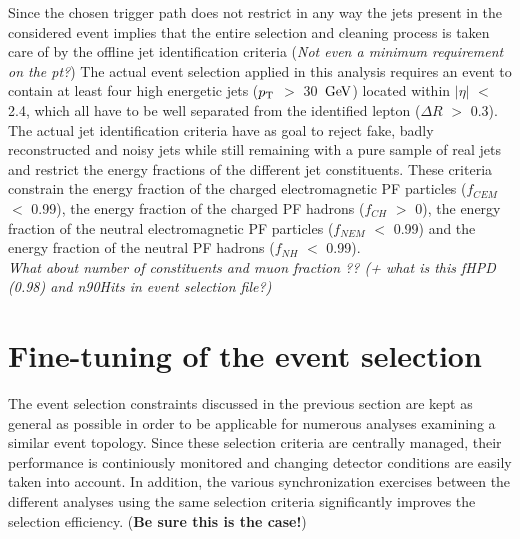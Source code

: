 Since the chosen trigger path does not restrict in any way the jets present in the considered event implies that the entire selection and cleaning process is taken care of by the offline jet identification criteria (\textit{Not even a minimum requirement on the pt?})
The actual event selection applied in this analysis requires an event to contain at least four high energetic jets ($p_{\rm T}$ $>$ 30 $\, \mathrm{GeV}$) located within $\vert \eta \vert$ $<$ 2.4, which all have to be well separated from the identified lepton ($\Delta R$ $>$ 0.3).
The actual jet identification criteria have as goal to reject fake, badly reconstructed and noisy jets while still remaining with a pure sample of real jets and restrict the energy fractions of the different jet constituents. These criteria constrain the energy fraction of the charged electromagnetic PF particles ($f_{CEM}$ $<$ 0.99), the energy fraction of the charged PF hadrons ($f_{CH}$ $>$ 0), the energy fraction of the neutral electromagnetic PF particles ($f_{NEM}$ $<$ 0.99) and the energy fraction of the neutral PF hadrons ($f_{NH}$ $<$ 0.99).
\\

\textit{What about number of constituents and muon fraction ?? (+ what is this fHPD (0.98) and n90Hits in event selection file?)}

\section{Fine-tuning of the event selection}\label{sec::SpecificSelec}

The event selection constraints discussed in the previous section are kept as general as possible in order to be applicable for numerous analyses examining a similar event topology.
Since these selection criteria are centrally managed, their performance is continiously monitored and changing detector conditions are easily taken into account.
In addition, the various synchronization exercises between the different analyses using the same selection criteria significantly improves the selection efficiency. (\textbf{Be sure this is the case!})
\\

